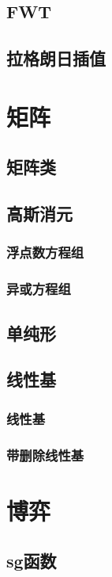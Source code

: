 ﻿\documentclass[a4paper,twocolumn]{article}
\begin{document}
\subsection{FWT}

\subsection{拉格朗日插值}

\section{矩阵}
\subsection{矩阵类}

\subsection{高斯消元}
\subsubsection{浮点数方程组}

\subsubsection{异或方程组}

\subsection{单纯形}

\subsection{线性基}
\subsubsection{线性基}

\subsubsection{带删除线性基}

\section{博弈}
\subsection{sg函数}

\end{document}
